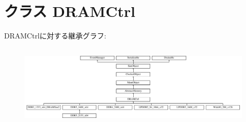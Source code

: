 \hypertarget{classDRAMCtrl_1_1DRAMCtrl}{
\section{クラス DRAMCtrl}
\label{classDRAMCtrl_1_1DRAMCtrl}
}
DRAMCtrlに対する継承グラフ:\begin{figure}[H]
\begin{center}
\leavevmode
\includegraphics[height=4.01434cm]{classDRAMCtrl_1_1DRAMCtrl}
\end{center}
\end{figure}

